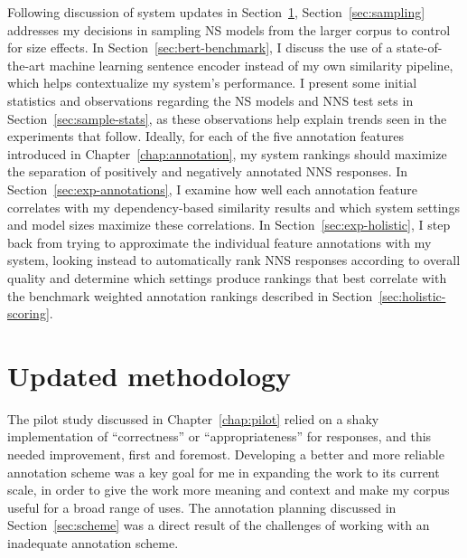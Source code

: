 Following discussion of system updates in Section~\ref{sec:current-method}, Section~\ref{sec:sampling} addresses my decisions in sampling NS models from the larger corpus to control for size effects. In Section~\ref{sec:bert-benchmark}, I discuss the use of a state-of-the-art machine learning sentence encoder instead of my own similarity pipeline, which helps contextualize my system's performance.
I present some initial statistics and observations regarding the NS models and NNS test sets in Section~\ref{sec:sample-stats}, as these observations help explain trends seen in the experiments that follow. 
Ideally, for each of the five annotation features introduced in Chapter~\ref{chap:annotation}, my system rankings should maximize the separation of positively and negatively annotated NNS responses.
In Section~\ref{sec:exp-annotations}, I examine how well each annotation feature correlates with my dependency-based similarity results and which system settings and model sizes maximize these correlations. In Section~\ref{sec:exp-holistic}, I step back from trying to approximate the individual feature annotations with my system, looking instead to automatically rank NNS responses according to overall quality and determine which settings produce rankings that best correlate with the benchmark weighted annotation rankings described in Section~\ref{sec:holistic-scoring}.


\section{Updated methodology}
\label{sec:current-method}
The pilot study discussed in Chapter~\ref{chap:pilot} relied on a shaky implementation of ``correctness'' or ``appropriateness'' for responses, and this needed improvement, first and foremost. Developing a better and more reliable annotation scheme was a key goal for me in expanding the work to its current scale, in order to give the work more meaning and context and make my corpus useful for a broad range of uses. The annotation planning discussed in Section~\ref{sec:scheme} was a direct result of the challenges of working with an inadequate annotation scheme. 

